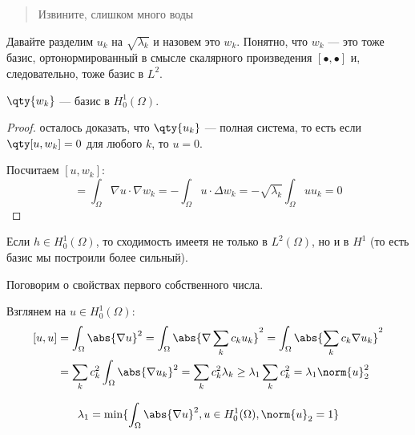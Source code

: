 \begin{quotation}
  Извините, слишком много воды
\end{quotation}


Давайте разделим $u_k$ на $\sqrt{\lambda_k}$ и назовем это $w_k$. Понятно, что $w_k$ --- это тоже базис, ортонормированный в смысле скалярного произведения $[\bullet, \bullet]$ и, следовательно, тоже базис в $L^2$.

\begin{thm*}
  $\qty{w_k}$ --- базис в $H_0^1(\Omega)$.
\end{thm*}

\begin{proof}
   осталось доказать, что $\qty{u_k}$  --- полная система, то есть если $\qty[u, w_k] = 0$ для любого $k$, то $u = 0$.
  
  Посчитаем $[u, w_k]$:
  \begin{equation}
    [u, w_k] = \int_\Omega \nabla u \cdot \nabla w_k = -\int_\Omega u \cdot \Delta w_k = -\sqrt{\lambda_k} \int_\Omega u u_k = 0
  \end{equation}
\end{proof}


Если $h \in H_0^1(\Omega)$, то сходимость имеетя не только в $L^2(\Omega)$, но и в $H^1$ (то есть базис мы построили более сильный).

Поговорим о свойствах первого собственного числа.


Взглянем на $u \in H_0^1(\Omega)$:
\begin{equation}
\begin{aligned}
  [u, u] &= \int_\Omega \abs{\nabla u}^2 = \int_\Omega \abs{\nabla \sum_k c_k u_k}^2 = \int_\Omega \abs{\sum_k c_k \nabla u_k}^2 \\
  &= \sum_k c_k^2 \int_\Omega \abs{\nabla u_k}^2 = \sum_k c_k^2 \lambda_k \ge \lambda_1 \sum_k c_k^2 = \lambda_1 \norm{u}_2^2
\end{aligned}
\end{equation}


\begin{thm*}
  \begin{equation}
    \lambda_1 = \min\{\int_\Omega \abs{\nabla u}^2, u \in H_0^1(\Omega), \norm{u}_2 = 1 \}
  \end{equation}
\end{thm*}

